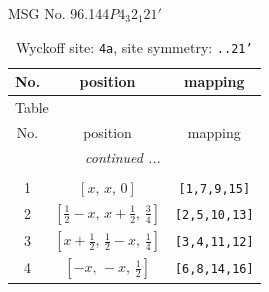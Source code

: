 \documentclass[fleqn,8pt]{jsarticle}
\begin{document}
\setcounter{MaxMatrixCols}{32}

\renewcommand{\tablename}{Table~}
\renewcommand{\figurename}{Figure~}
\begin{center}
\LARGE
MSG No. 96.144\quad$P4_{3}2_{1}21'$
\end{center}
\renewcommand{\arraystretch}{1.2}
\begin{longtable}{ccc}
\caption{Wyckoff site: {\tt 4a}, site symmetry: {\tt ..21'}}
 \\
 \hline \hline
No. & position & mapping \\ \hline \endfirsthead

\multicolumn{2}{l}{\tablename\ \thetable{}} \\
 \hline \hline
No. & position & mapping \\ \hline \endhead

 \hline \hline
\multicolumn{2}{r}{\footnotesize\it continued ...} \\ \endfoot

 \hline \hline
\multicolumn{2}{r}{} \\ \endlastfoot

1 & $\left[ x,\, x,\, 0 \right]$ & {\tt [1,7,9,15]} \\ \hline
2 & $\left[ \frac{1}{2} - x,\, x + \frac{1}{2},\, \frac{3}{4} \right]$ & {\tt [2,5,10,13]} \\ \hline
3 & $\left[ x + \frac{1}{2},\, \frac{1}{2} - x,\, \frac{1}{4} \right]$ & {\tt [3,4,11,12]} \\ \hline
4 & $\left[ - x,\, - x,\, \frac{1}{2} \right]$ & {\tt [6,8,14,16]} \\
\end{longtable}
\renewcommand{\arraystretch}{1.2}
\end{document}
